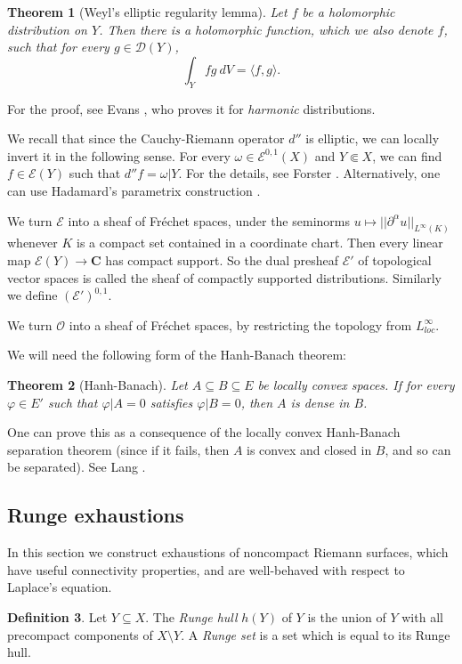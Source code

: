 \documentclass[reqno,12pt,letterpaper]{amsart}
\newcommand{\CC}{\mathbf{C}}
\newcommand{\dfn}[1]{\emph{#1}\index{#1}}
\newcommand{\Olo}{\mathscr O}
\newcommand{\Smooth}{\mathscr E}
\newcommand{\Test}{\mathscr D}
\newtheorem{theorem}{Theorem}[section]
\theoremstyle{definition}
\newtheorem{definition}[theorem]{Definition}
\begin{document}
\begin{theorem}[Weyl's elliptic regularity lemma]
Let $f$ be a holomorphic distribution on $Y$. Then there is a holomorphic function, which we also denote $f$, such that for every $g \in \Test(Y)$,
$$\int_Y fg ~dV = \langle f, g\rangle.$$
\end{theorem}
For the proof, see Evans \cite[\S2.2]{evans2010partial}, who proves it for \emph{harmonic} distributions.

We recall that since the Cauchy-Riemann operator $d''$ is elliptic, we can locally invert it in the following sense.
For every $\omega \in \Smooth^{0,1}(X)$ and $Y \Subset X$, we can find $f \in \Smooth(Y)$ such that $d''f = \omega|Y$.
For the details, see Forster \cite[Corollary 14.16]{gilligan2012lectures}.
Alternatively, one can use Hadamard's parametrix construction \cite[Theorem 17.1.1']{hörmander1994analysis}.

We turn $\Smooth$ into a sheaf of Fr\'echet spaces, under the seminorms $u \mapsto ||\partial^\alpha u||_{L^\infty(K)}$ whenever $K$ is a compact set contained in a coordinate chart.
Then every linear map $\Smooth(Y) \to \CC$ has compact support.
So the dual presheaf $\Smooth'$ of topological vector spaces is called the sheaf of compactly supported distributions.
Similarly we define $(\Smooth')^{0,1}$.

We turn $\Olo$ into a sheaf of Fr\'echet spaces, by restricting the topology from $L^\infty_{loc}$.

We will need the following form of the Hanh-Banach theorem:
\begin{theorem}[Hanh-Banach]
Let $A \subseteq B \subseteq E$ be locally convex spaces.
If for every $\varphi \in E'$ such that $\varphi|A = 0$ satisfies $\varphi|B = 0$, then $A$ is dense in $B$.
\end{theorem}
One can prove this as a consequence of the locally convex Hanh-Banach separation theorem (since if it fails, then $A$ is convex and closed in $B$, and so can be separated).
See Lang \cite[Appendix IV, Theorem 1.2]{lang1993real}.

\subsection{Runge exhaustions}
In this section we construct exhaustions of noncompact Riemann surfaces, which have useful connectivity properties, and are well-behaved with respect to Laplace's equation.

\begin{definition}
Let $Y \subseteq X$. The \dfn{Runge hull} $h(Y)$ of $Y$ is the union of $Y$ with all precompact components of $X \setminus Y$.
A \dfn{Runge set} is a set which is equal to its Runge hull.
\end{definition}
\end{document}
